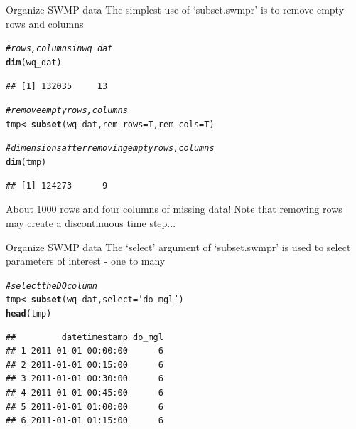 \documentclass[xcolor=svgnames]{beamer}\usepackage[]{graphicx}\usepackage[]{color}
\makeatletter
\newcommand{\hlstr}[1]{\textcolor[rgb]{0.192,0.494,0.8}{#1}}%
\newcommand{\hlcom}[1]{\textcolor[rgb]{0.678,0.584,0.686}{\textit{#1}}}%
\newcommand{\hlstd}[1]{\textcolor[rgb]{0.345,0.345,0.345}{#1}}%
\newcommand{\hlkwb}[1]{\textcolor[rgb]{0.69,0.353,0.396}{#1}}%
\newcommand{\hlkwc}[1]{\textcolor[rgb]{0.333,0.667,0.333}{#1}}%
\newcommand{\hlkwd}[1]{\textcolor[rgb]{0.737,0.353,0.396}{\textbf{#1}}}%
\newenvironment{kframe}{%
 \def\at@end@of@kframe{}%
 \ifinner\ifhmode%
  \def\at@end@of@kframe{\end{minipage}}%
  \begin{minipage}{\columnwidth}%
 \fi\fi%
 \def\FrameCommand##1{\hskip\@totalleftmargin \hskip-\fboxsep
 \colorbox{shadecolor}{##1}\hskip-\fboxsep
     \hskip-\linewidth \hskip-\@totalleftmargin \hskip\columnwidth}%
 \MakeFramed {\advance\hsize-\width
   \@totalleftmargin\z@ \linewidth\hsize
   \@setminipage}}%
 {\par\unskip\endMakeFramed%
 \at@end@of@kframe}
\newenvironment{knitrout}{}{} %
\makeatother
\begin{document}
\begin{frame}[containsverbatim]{Organize SWMP data}
The simplest use of `subset.swmpr' is to remove empty rows and columns
\begin{knitrout}\scriptsize
{}\color{fgcolor}\begin{kframe}
\begin{alltt}
\hlcom{# rows, columns in wq_dat}
\hlkwd{dim}\hlstd{(wq_dat)}
\end{alltt}
\begin{verbatim}
## [1] 132035     13
\end{verbatim}
\begin{alltt}
\hlcom{# remove empty rows, columns}
\hlstd{tmp} \hlkwb{<-} \hlkwd{subset}\hlstd{(wq_dat,} \hlkwc{rem_rows} \hlstd{= T,} \hlkwc{rem_cols} \hlstd{= T)}

\hlcom{# dimensions after removing empty rows, columns}
\hlkwd{dim}\hlstd{(tmp)}
\end{alltt}
\begin{verbatim}
## [1] 124273      9
\end{verbatim}
\end{kframe}
\end{knitrout}
About 1000 rows and four columns of missing data!  Note that removing rows may create a discontinuous time step...
\end{frame}

\begin{frame}[containsverbatim]{Organize SWMP data}
The `select' argument of `subset.swmpr' is used to select parameters of interest - one to many
\begin{knitrout}\scriptsize
{}\color{fgcolor}\begin{kframe}
\begin{alltt}
\hlcom{# select the DO column}
\hlstd{tmp} \hlkwb{<-} \hlkwd{subset}\hlstd{(wq_dat,} \hlkwc{select} \hlstd{=} \hlstr{'do_mgl'}\hlstd{)}
\hlkwd{head}\hlstd{(tmp)}
\end{alltt}
\begin{verbatim}
##         datetimestamp do_mgl
## 1 2011-01-01 00:00:00      6
## 2 2011-01-01 00:15:00      6
## 3 2011-01-01 00:30:00      6
## 4 2011-01-01 00:45:00      6
## 5 2011-01-01 01:00:00      6
## 6 2011-01-01 01:15:00      6
\end{verbatim}
\end{kframe}
\end{knitrout}
\end{frame}
\end{document}
